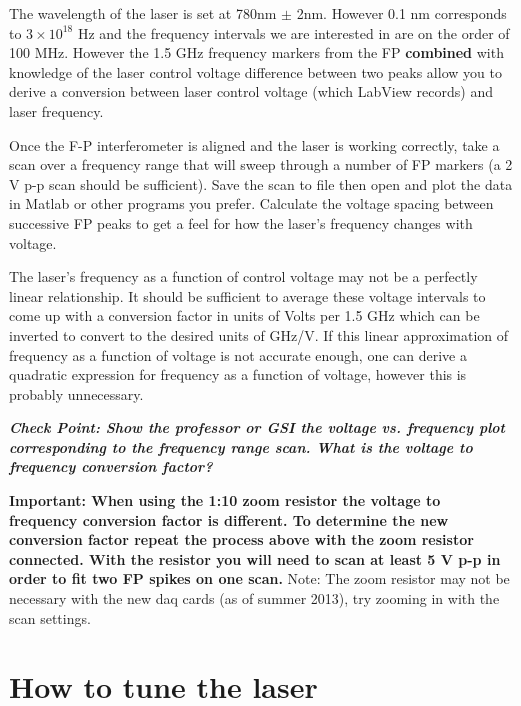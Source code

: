 \documentclass{../lab}
\begin{document}
The wavelength of the laser is set at 780nm $\pm$ 2nm. However 0.1 nm corresponds to $3 \times 10^{18}$ Hz and the frequency intervals we are interested in are on the order of 100 MHz. However the 1.5 GHz frequency markers from the FP \textbf{combined} with knowledge of the laser control voltage difference between two peaks allow you to derive a conversion between laser control voltage (which LabView records) and laser frequency.

Once the F-P interferometer is aligned and the laser is working correctly, take a scan over a frequency range that will sweep through a number of FP markers (a 2 V p-p scan should be sufficient). Save the scan to file then open and plot the data in Matlab or other programs you prefer. Calculate the voltage spacing between successive FP peaks to get a feel for how the laser's frequency changes with voltage.

The laser's frequency as a function of control voltage may not be a perfectly linear relationship. It should be sufficient to average these voltage intervals to come up with a conversion factor in units of Volts per 1.5 GHz which can be inverted to convert to the desired units of GHz/V. If this linear approximation of frequency as a function of voltage is not accurate enough, one can derive a quadratic expression for frequency as a function of voltage, however this is probably unnecessary.

\emph{\textbf{Check Point: Show the professor or GSI the voltage vs. frequency plot corresponding to the frequency range scan. What is the voltage to frequency conversion factor?}} 

\textbf{Important: When using the 1:10 zoom resistor the voltage to frequency conversion factor is different. To determine the new conversion factor repeat the process above with the zoom resistor connected. With the resistor you will need to scan at least 5 V p-p in order to fit two FP spikes on one scan.} Note: The zoom resistor may not be necessary with the new daq cards (as of summer 2013), try zooming in with the scan settings.

\newpage

\section{How to tune the laser}
\end{document}
